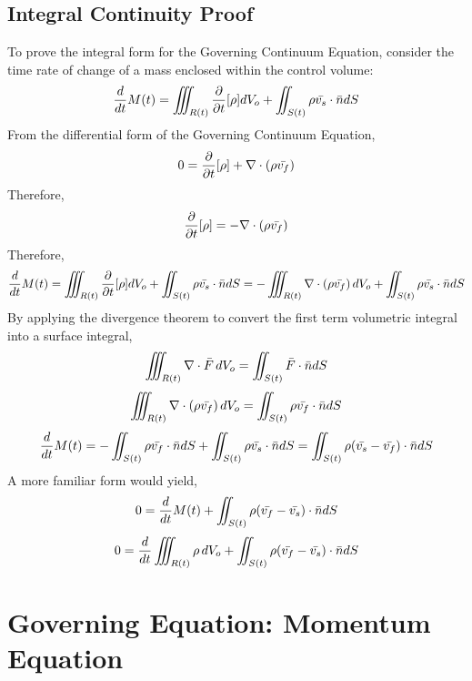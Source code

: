 \documentclass[a4paper, 12pt]{report}
\begin{document}
\begin{center}
\subsection{Integral Continuity Proof}
\begin{comment}
\end{comment}
To prove the integral form for the Governing Continuum Equation, consider the time rate of change of a mass enclosed within the control volume:
$$\frac{d}{dt} M(t) = \iiint_{R(t)}\frac{\partial}{\partial t}[\rho]dV_o + \iint_{S(t)}\rho\bar{v_s}\cdot\bar{n}dS$$
From the differential form of the Governing Continuum Equation, 
$$0 = \frac{\partial}{\partial t}[\rho] +  \nabla \cdot (\rho\bar{v_f})$$
Therefore,
$$\frac{\partial}{\partial t}[\rho] =  -\nabla \cdot (\rho\bar{v_f})$$
Therefore,
$$\frac{d}{dt} M(t) = \iiint_{R(t)}\frac{\partial}{\partial t}[\rho]dV_o + \iint_{S(t)}\rho\bar{v_s}\cdot\bar{n}dS = -\iiint_{R(t)}\nabla \cdot (\rho\bar{v_f})\,dV_o + \iint_{S(t)}\rho\bar{v_s}\cdot\bar{n}dS$$
By applying the divergence theorem to convert the first term volumetric integral into a surface integral,
$$\iiint_{R(t)}  \nabla \cdot \bar{F} \,dV_o = \iint_{S(t)}\bar{F}\cdot \bar{n}dS$$
$$\iiint_{R(t)}  \nabla \cdot (\rho\bar{v_f}) \,dV_o = \iint_{S(t)}\rho\bar{v_f}\cdot \bar{n}dS$$
$$\frac{d}{dt} M(t) = -\iint_{S(t)}\rho\bar{v_f}\cdot\bar{n}dS + \iint_{S(t)}\rho\bar{v_s}\cdot\bar{n}dS = \iint_{S(t)}\rho(\bar{v_s} -\bar{v_f})\cdot\bar{n}dS$$
A more familiar form would yield,
$$0 = \frac{d}{dt} M(t) + \iint_{S(t)}\rho(\bar{v_f} - \bar{v_s})\cdot\bar{n}dS$$
$$0 = \frac{d}{dt}\iiint_{R(t)} \rho \,dV_o + \iint_{S(t)}\rho(\bar{v_f} - \bar{v_s})\cdot\bar{n}dS$$
\section{Governing Equation: Momentum Equation}
\begin{comment}
Governing Equation: Momentum Equation

More information should be shed on the the part of \rho \b{v_f}\b{v_s} \d \b{n}dS. What does this even mean, there are two vectors so how does the order of operations work in this case?

More information should also be used in the case of \nabla \d (\rho \b{v_f}\b{v_s}). Again, can chain rule be applied to nabla \cdot operation? How is the \nabla \d (\rho \b{v_f}\b{v_s}) computed?

Derivations on the Tensor part, proving that the integral of the body force and the surface force yielding -\nabla P_r + \nabla \d \tau + \rho \b{F_b} has not been proven.


\end{comment}
\end{center}
\end{document}

